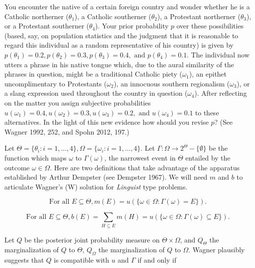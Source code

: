 \documentclass[11pt]{article}
\begin{document}
\begin{quotex}
  You encounter the native of a certain foreign country and wonder
  whether he is a Catholic northerner ($\theta_{1}$), a Catholic
  southerner ($\theta_{2}$), a Protestant northerner ($\theta_{3}$),
  or a Protestant southerner ($\theta_{4}$). Your prior probability
  $p$ over these possibilities (based, say, on population statistics
  and the judgment that it is reasonable to regard this individual as
  a random representative of his country) is given by
  $p(\theta_{1})=0.2,p(\theta_{2})=0.3,p(\theta_{3})=0.4,\mbox{ and
  }p(\theta_{4})=0.1$. The individual now utters a phrase in his
  native tongue which, due to the aural similarity of the phrases in
  question, might be a traditional Catholic piety ($\omega_{1}$), an
  epithet uncomplimentary to Protestants ($\omega_{2}$), an innocuous
  southern regionalism ($\omega_{3}$), or a slang expression used
  throughout the country in question ($\omega_{4}$). After reflecting
  on the matter you assign subjective probabilities
  $u(\omega_{1})=0.4,u(\omega_{2})=0.3,u(\omega_{3})=0.2,\mbox{ and
  }u(\omega_{4})=0.1$ to these alternatives. In the light of this new
  evidence how should you revise $p$? (See Wagner 1992, 252,
  and Spohn 2012, 197.)
\end{quotex}

Let
$\Theta=\{\theta_{i}:i=1,\ldots,4\},\Omega=\{\omega_{i}:i=1,\ldots,4\}$.
Let $\Gamma:\Omega\rightarrow{}2^{\Theta}-\{\emptyset\}$ be the
function which maps $\omega$ to $\Gamma(\omega)$, the narrowest event
in $\Theta$ entailed by the outcome $\omega\in\Omega$. Here are two
definitions that take advantage of the apparatus established by Arthur
Dempster (see Dempster 1967). We will need $m$ and $b$ to
articulate Wagner's (W) solution for \emph{Linguist} type problems.

\begin{equation}
  \mbox{For all }E\subseteq{}\Theta, m(E)=u(\{\omega\in\Omega:\Gamma(\omega)=E\})\label{eq:mof}.
\end{equation}

\begin{equation}
  \mbox{For all }E\subseteq{}\Theta, b(E)=\sum_{H\subseteq{}E}m(H)=u(\{\omega\in\Omega:\Gamma(\omega)\subseteq{}E\})\label{eq:bof}.
\end{equation}

Let $Q$ be the posterior joint probability measure on
$\Theta\times\Omega$, and $Q_{\Theta}$ the marginalization of $Q$ to
$\Theta$, $Q_{\Omega}$ the marginalization of $Q$ to $\Omega$.
Wagner plausibly suggests that $Q$ is compatible with $u$ and $\Gamma$
if and only if
\end{document}
